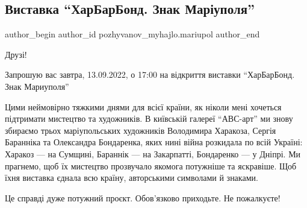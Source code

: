  
 
 
 
 

\subsection{Виставка \enquote{ХарБарБонд. Знак Маріуполя}}
\label{sec:12_09_2022.fb.pozhyvanov_myhajlo.mariupol.1.vystavka_harbarbond_znak_mariupolja}

\ifcmt
 author_begin
   author_id pozhyvanov_myhajlo.mariupol
 author_end
\fi

Друзі! 

Запрошую вас завтра, 13.09.2022, о 17:00 на відкриття виставки \enquote{ХарБарБонд.
Знак Мариуполя}


Цими неймовірно тяжкими днями для всієї країни, як ніколи мені хочеться
підтримати мистецтво та художників. В київській галереї \enquote{АВС-арт} ми знову
збираємо трьох маріупольських художників Володимира Харакоза, Сергія Баранніка
та Олександра Бондаренка, яких нині війна розкидала по всій Україні: Харакоз —
на Сумщині, Бараннік — на Закарпатті, Бондаренко — у Дніпрі. Ми прагнемо, щоб
їх мистецтво прозвучало якомога потужніше та яскравіше. Щоб їхня виставка
єднала всю країну, авторськими символами й знаками.

Це справді дуже потужний проєкт. Обов'язково приходьте. Не пожалкуєте!

